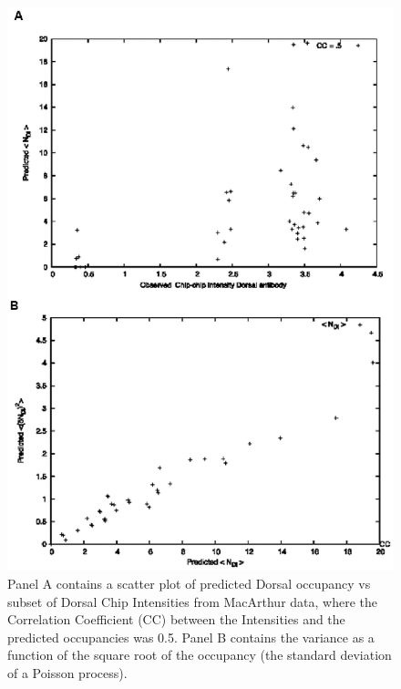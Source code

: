 \begin{figure}
   \includegraphics[]{dorsaltopvar}
   \caption{Panel A contains a scatter plot of predicted Dorsal occupancy vs subset of Dorsal Chip Intensities from MacArthur data\cite{pmid19627575}, where the Correlation Coefficient (CC) between the Intensities and the predicted occupancies was 0.5.  Panel B contains the variance as a function of the square root of the occupancy (the standard deviation of a Poisson process).}\label{rd}
\end{figure} 


